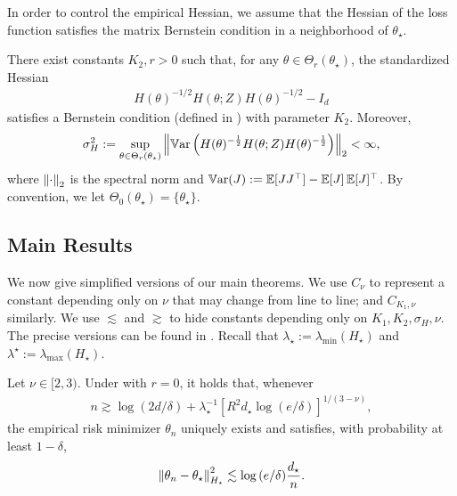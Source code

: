 In order to control the empirical Hessian, we assume that the Hessian of the loss function satisfies the matrix Bernstein condition in a neighborhood of $\theta_\star$.

\begin{assumption}
\label{asmp:bernstein}
    There exist constants $K_2, r > 0$ such that, for any $\theta \in \Theta_{r}(\theta_\star)$, the standardized Hessian
    \begin{align*}
        H(\theta)^{-1/2} H(\theta; Z) H(\theta)^{-1/2} - I_d
    \end{align*}
    satisfies a Bernstein condition (defined in ) with parameter $K_2$. Moreover,
    \begin{align*}
        \sigma_H^2 := \sup_{\theta \in \Theta_{r}(\theta_\star)} \left\lVert \operatorname{\mathbb{V}ar}\left( H(\theta)^{-\frac12}H(\theta; Z)H(\theta)^{-\frac12} \right) \right\rVert_2 < \infty,
    \end{align*}
    where $\left\lVert \cdot \right\rVert_2$ is the spectral norm and $\operatorname{\mathbb{V}ar}(J) := \operatorname{\mathbb E}[JJ^\top] - \operatorname{\mathbb E}[J] \operatorname{\mathbb E}[J]^\top$.
    By convention, we let $\Theta_0(\theta_\star) = \{\theta_\star\}$.
\end{assumption}

\subsection{Main Results}
\label{sub:main_results}

We now give simplified versions of our main theorems.
We use $C_\nu$ to represent a constant depending only on $\nu$ that may change from line to line; and $C_{K_1, \nu}$ similarly.
We use $\lesssim$ and $\gtrsim$ to hide constants depending only on $K_1, K_2, \sigma_H, \nu$.
The precise versions can be found in .
Recall that $\lambda_\star := \lambda_{\min}(H_\star)$ and $\lambda^\star := \lambda_{\max}(H_\star)$.
\begin{theorem}\label{thm:risk_bound_generalized}
    Let $\nu \in [2, 3)$.
    Under  with $r = 0$, it holds that,
    whenever
    \begin{align*}
        n \gtrsim \log{(2d/\delta)} + \lambda_\star^{-1} \left[ R^2 d_\star \log{(e/\delta)} \right]^{1/(3-\nu)},
    \end{align*}
    the empirical risk minimizer $\theta_n$ uniquely exists and satisfies, with probability at least $1 - \delta$,
    \begin{align}\label{eq:conf_bound}
        \left\lVert \theta_n - \theta_\star \right\rVert^2_{H_\star} \lesssim \log{(e/\delta)} \frac{d_\star}{n}.
    \end{align}
\end{theorem}

